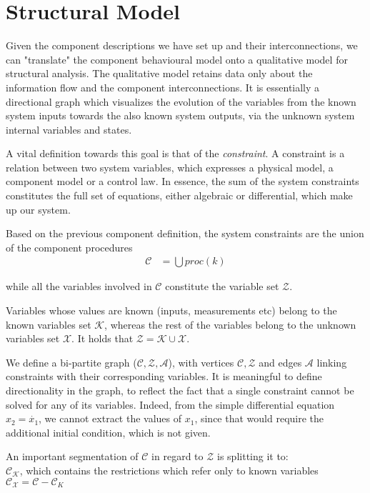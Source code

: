 \section{Structural Model}

Given the component descriptions we have set up and their interconnections, we can "translate" the component behavioural model onto a qualitative model for structural analysis. The qualitative model retains data only about the information flow and the component interconnections. It is essentially a directional graph which visualizes the evolution of the variables from the known system inputs towards the also known system outputs, via the unknown system internal variables and states.

A vital definition towards this goal is that of the \textit{constraint}. A constraint is a relation between two system variables, which expresses a physical model, a component model or a control law. In essence, the sum of the system constraints constitutes the full set of equations, either algebraic or differential, which make up our system.

Based on the previous component definition, the system constraints are the union of the component procedures
\begin{align*}
\mathcal{C } &= \bigcup proc(k)
\end{align*}

while all the variables involved in $\mathcal{C}$ constitute the variable set $\mathcal{Z}$.

Variables whose values are known (inputs, measurements etc) belong to the known variables set $\mathcal{K}$, whereas the rest of the variables belong to the unknown variables set $\mathcal{X}$. It holds that $\mathcal{Z = K \cup X}$.

We define a bi-partite graph ($\mathcal{C, Z, A}$), with vertices $\mathcal{C, Z}$ and edges $\mathcal{A}$ linking constraints with their corresponding variables.
It is meaningful to define directionality in the graph, to reflect the fact that a single constraint cannot be solved for any of its variables. Indeed, from the simple differential equation $x_2 = \dot{x_1}$, we cannot extract the values of $x_1$, since that would require the additional initial condition, which is not given.

An important segmentation of $\mathcal{C}$ in regard to $\mathcal{Z}$ is splitting it to:\\
$\mathcal{C_K}$, which contains the restrictions which refer only to known variables\\
$\mathcal{C_X}=\mathcal{C-C}_K$

